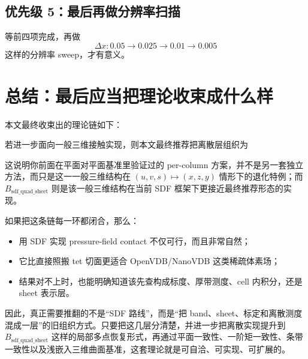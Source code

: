 \documentclass[12pt,a4paper]{ctexart}
\begin{document}
\subsection{优先级 5：最后再做分辨率扫描}
等前四项完成，再做
\begin{equation}
    \Delta x: 0.05 \to 0.025 \to 0.01 \to 0.005
\end{equation}
这样的分辨率 sweep，才有意义。

\section{总结：最后应当把理论收束成什么样}

本文最终收束出的理论链如下：
\begin{center}
\end{center}

若进一步面向一般三维接触实现，则本文最终推荐把离散层组织为
\begin{center}
\end{center}
这说明你前面在平面对平面基准里验证过的 per-column 方案，并不是另一套独立方法，而只是这一一般三维结构在 $(u,v,s)\mapsto(x,z,y)$ 情形下的退化特例；而 $B_{\mathrm{sdf\_quad\_sheet}}$ 则是该一般三维结构在当前 SDF 框架下更接近最终推荐形态的实现。

如果把这条链每一环都闭合，那么：
\begin{itemize}
    \item 用 SDF 实现 pressure-field contact 不仅可行，而且非常自然；
    \item 它比直接照搬 tet 切面更适合 OpenVDB/NanoVDB 这类稀疏体素场；
    \item 结果对不上时，也能明确知道该先查构成标度、厚带测度、cell 内积分，还是 sheet 表示层。
\end{itemize}

因此，真正需要推翻的不是“SDF 路线”，而是“把 band、sheet、标定和离散测度混成一层”的旧组织方式。只要把这几层分清楚，并进一步把离散实现提升到 $B_{\mathrm{sdf\_quad\_sheet}}$ 这样的局部多点恢复形式，再通过平面一致性、一阶矩一致性、条带一致性以及浅嵌入三维曲面基准，这套理论就是可自洽、可实现、可扩展的。
\end{document}
